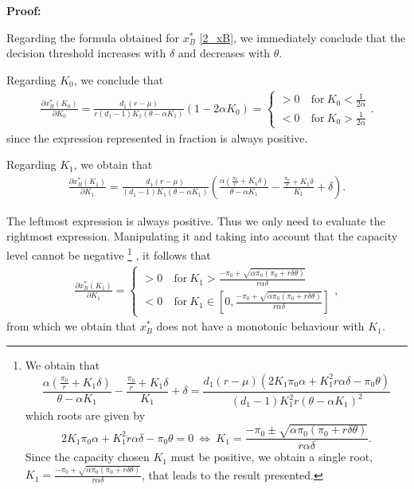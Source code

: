 \textbf{Proof:}

Regarding the formula obtained for  $x^*_B$ \eqref{2_xB}, we immediately conclude that the decision threshold increases with $\delta$ and decreases with $\theta$.


Regarding $K_0$, we conclude that
\begin{align*}
\frac{\partial x^*_B ( K_0 ) }{\partial K_0}= 
\frac{d_1 (r-\mu )}{r (d_1-1)K_1(\theta-\alpha K_1)} (1-2\alpha K_0)
=
\begin{cases}
>0 &\ \text{for} \ K_0<\frac{1}{2 \alpha}\\
<0 &\ \text{for} \ K_0>\frac{1}{2 \alpha}
\end{cases}.
\end{align*}
since the expression represented in fraction is always positive.


Regarding $K_1$, we obtain that
\begin{align*}
\frac{\partial x^*_B ( K_1 ) }{\partial K_1}= 
\frac{d_1 (r-\mu )}{ (d_1-1)K_1(\theta-\alpha K_1)}  \left( \frac{\alpha (\frac{\pi_0}{r}+K_1 \delta )}{\theta-\alpha K_1} -\frac{ \frac{\pi_0}{r}+K_1 \delta }{K_1}+ \delta \right).
\end{align*}


The leftmost expression is always positive. Thus we only need to evaluate the rightmost expression. Manipulating it and taking into account that the capacity level cannot be negative
\footnote{We obtain that 
	$$\frac{\alpha (\frac{\pi_0}{r}+K_1 \delta )}{\theta-\alpha K_1} -\frac{ \frac{\pi_0}{r}+K_1 \delta }{K_1}+ \delta =
\frac{d_1 (r-\mu) (2K_1 \pi_0 \alpha+K^2_1r \alpha \delta -\pi_0 \theta)}{(d_1-1)K_1^2r(\theta-\alpha K_1)^2}$$
which roots are given by
$$ 2K_1 \pi_0 \alpha+K^2_1r \alpha \delta -\pi_0 \theta =0  \ \Leftrightarrow \ K_1=\frac{-\pi_0 \pm \sqrt{\alpha \pi_0 (\pi_0 + r \delta \theta)}}{ r\alpha \delta}.
$$
Since the capacity chosen $K_1$ must be positive, we obtain a single root, $K_1=\frac{-\pi_0 + \sqrt{\alpha \pi_0 (\pi_0 + r \delta \theta)}}{ r\alpha \delta}$, that leads to the result presented.}
, it follows that
\begin{align*}
\frac{\partial x^*_B ( K_1 ) }{\partial K_1}= 
\begin{cases}
>0 &\ \text{for} \ K_1>\frac{-\pi_0+\sqrt{\alpha \pi_0 (\pi_0 + r \delta \theta)}}{ r\alpha \delta}\\
<0 &\ \text{for} \ K_1 \in \left[ 0, \frac{-\pi_0+\sqrt{\alpha \pi_0(\pi_0 + r \delta \theta)}}{ r\alpha \delta} \right]
\end{cases},
\end{align*}
from which we obtain that $x^*_B$ does not have a monotonic behaviour with $K_1$.


